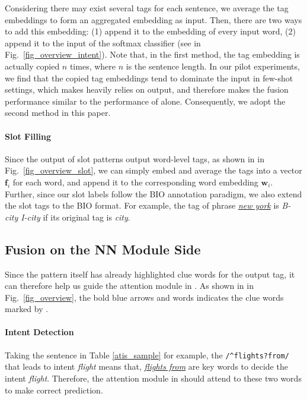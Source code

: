 Considering there may exist several \RE tags for each sentence, we average the tag embeddings to form an aggregated embedding as input.
Then, there are two ways to add this embedding: (1) append it to the embedding of every input word, (2) append it to the input of the softmax classifier (see  in Fig.~\ref{fig_overview_intent}).
Note that, in the first method, the tag embedding is actually copied $n$ times, where $n$ is the sentence length.
In our pilot experiments, we find that the copied tag embeddings tend to dominate the input in few-shot settings, which makes \NN heavily relies on \RE output, and therefore makes the fusion performance similar to the performance of \RE alone. Consequently, we adopt the second method in this paper.

\paragraph{Slot Filling}
Since the output of slot \RE patterns output word-level tags, as shown in  in Fig.~\ref{fig_overview_slot}, we can simply embed and average the \RE tags into a vector $\textbf{f}_i$ for each word, and append it to the corresponding word embedding $\textbf{w}_i$.
Further, since our slot labels follow the BIO annotation paradigm, we also extend the slot \RE tags to the BIO format. For example, the \RE tag of phrase \textsl{\underline{new york}} is \emph{B-city I-city} if its original tag is \emph{city}.

\subsection{Fusion on the NN Module Side}
\label{interact_with_module}
Since the \RE pattern itself has already highlighted clue words for the output tag, it can therefore help us guide the attention module in \NN.
As shown in  in Fig.~\ref{fig_overview}, the bold blue arrows and words indicates the clue words marked by \RE.
\paragraph{Intent Detection}
Taking the sentence in Table \ref{atis_sample} for example, the \RE \texttt{/\textasciicircum flights?\:from/} that leads to intent \emph{flight} means that, \textsl{\underline{flights from}} are key words to decide the intent \emph{flight}. Therefore, the attention module in \NN should attend to these two words to make correct prediction.

